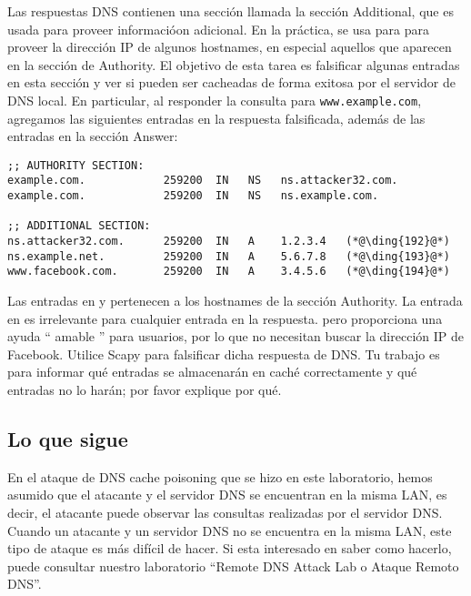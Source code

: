 Las respuestas DNS contienen una sección llamada la sección Additional, que es usada para proveer informacióon adicional. En la práctica, se usa para para proveer la dirección IP de algunos hostnames, en especial aquellos que aparecen en la sección de Authority. El objetivo de esta tarea es falsificar algunas entradas en esta sección y ver si pueden ser cacheadas de forma exitosa por el servidor de DNS local. En particular, al responder la consulta para \texttt{www.example.com}, agregamos las siguientes entradas en la respuesta falsificada, además de las entradas en la sección Answer:

\begin{lstlisting}
;; AUTHORITY SECTION:
example.com.            259200  IN   NS   ns.attacker32.com.
example.com.            259200  IN   NS   ns.example.com.

;; ADDITIONAL SECTION:
ns.attacker32.com.      259200  IN   A    1.2.3.4   (*@\ding{192}@*)
ns.example.net.         259200  IN   A    5.6.7.8   (*@\ding{193}@*)
www.facebook.com.       259200  IN   A    3.4.5.6   (*@\ding{194}@*)
\end{lstlisting}

Las entradas en   y  pertenecen a los hostnames de la sección Authority. La entrada en   es irrelevante para cualquier entrada en la respuesta. pero proporciona una ayuda `` amable '' para usuarios, por lo que no necesitan buscar la dirección IP de Facebook. Utilice Scapy para falsificar dicha respuesta de DNS. Tu trabajo es para informar qué entradas se almacenarán en caché correctamente y qué entradas no lo harán; por favor explique por qué.


\subsection{Lo que sigue}

En el ataque de DNS cache poisoning que se hizo en este laboratorio, hemos asumido que el atacante y el servidor DNS se encuentran en la misma LAN, es decir, el atacante puede observar las consultas realizadas por el servidor DNS.
Cuando un atacante y un servidor DNS no se encuentra en la misma LAN, este tipo de ataque es más difícil de hacer. Si esta interesado en saber como hacerlo, puede consultar nuestro laboratorio ``Remote DNS Attack Lab o Ataque Remoto DNS''.



